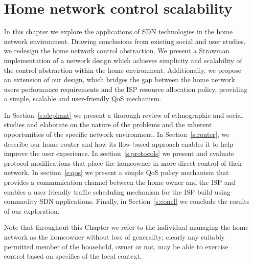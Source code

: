 \chapter{Home network control scalability} 

\ifpdf
\graphicspath{{Chapter2/Chapter2Figs/PNG/}{Chapter2/Chapter2Figs/PDF/}{Chapter2/Chapter2Figs/}}
\else 
\graphicspath{{Chapter2/Chapter2Figs/EPS/}{Chapter2/Chapter2Figs/}} 
\fi

In this chapter we explore the applications of SDN technologies in the home
network environment. Drawing conclusions from existing social and user studies,
we redesign the home network control abstraction. We present a Strawman
implementation of a network design which achieves simplicity and scalability of
the control abstraction within the home environment. Additionally, we propose an
extension of our design, which bridges the gap between the home network users
performance requirements and the ISP resource allocation policy, providing a
simple, scalable and user-friendly QoS mechanism.

In Section~\ref{s:elephant} we present a thorough review of ethnographic and
social studies and elaborate on the nature of the problems and the inherent
opportunities of the specific network environment. In Section~\ref{s:router}, we
describe our home router and how its flow-based approach enables it to help
improve the user experience. In section~\ref{s:protocols} we present and evaluate
protocol modifications that place the homeowner in more direct control of their
network. In section~\ref{s:qos} we present a simple QoS policy mechanism that
provides a communication channel between the home owner and the ISP and enables
a user friendly traffic scheduling mechanism for the ISP build using commodity
SDN applications. Finally, in Section~\ref{s:concl} we conclude the results of
our exploration.

Note that throughout this Chapter we refer to the individual managing the home
network as the homeowner without loss of generality; clearly any suitably
permitted member of the household, owner or not, may be able to exercise control
based on specifics of the local context. 


